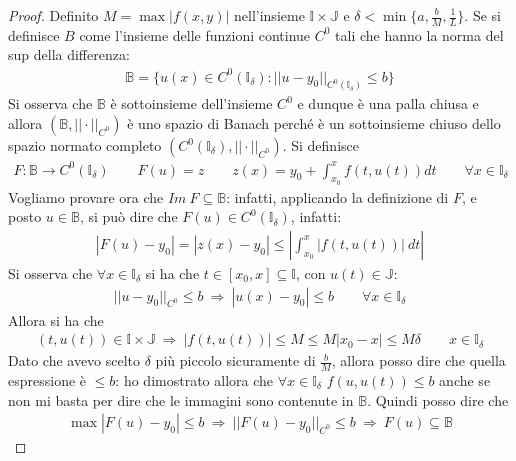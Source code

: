 \documentclass[a4paper, oneside]{book}
\begin{document}
\begin{proof}
    Definito $M = \max \left| f(x, y) \right|$ nell'insieme $\mathbb{I} \times \mathbb{J}$ e $\delta < \min\{a, \frac{b}{M}, \frac{1}{L}\}$.
    Se si definisce $B$ come l'insieme delle funzioni continue $C^{0}$ tali che hanno la norma
    del sup della differenza:
    \begin{gather*}
        \mathbb{B} = \{u(x) \in C^{0}(\mathbb{I}_\delta) : ||u - y_0||_{C^{0} (\mathbb{I}_\delta) } \leq b\}
    \end{gather*} 
    Si osserva che $\mathbb{B}$ è sottoinsieme dell'insieme $C^{0}$ e dunque è una palla chiusa e allora
    $(\mathbb{B}, || \cdot ||_{C^{0} })$ è uno spazio di Banach perché è un sottoinsieme chiuso dello
    spazio normato completo $(C^{0}(\mathbb{I}_\delta),||\cdot ||_{C^{0} } )$. Si definisce
    \begin{gather*}
        F : \mathbb{B} \to C^{0}(\mathbb{I}_\delta) \qquad F(u) = z \qquad z(x) = y_0 + \int_{x_0}^{x} f(t, u(t))dt \qquad \forall x \in \mathbb{I}_\delta 
    \end{gather*}
    Vogliamo provare ora che  $Im \ F \subseteq \mathbb{B}$: infatti, applicando la definizione di
    $F$, e posto $u \in \mathbb{B}$, si può dire che $F(u) \in C^{0}(\mathbb{I}_\delta)$, infatti:
    \begin{gather*}
        |F(u) - y_0| = |z(x) - y_0| \leq \left| \int_{x_0}^{x} \left| f(t, u(t)) \right| \ dt  \right|  
    \end{gather*}
    Si osserva che $\forall x \in \mathbb{I}_\delta$ si ha che $t \in [x_0, x] \subseteq \mathbb{I}$, con $u(t) \in \mathbb{J}$:
    \begin{gather*}
        ||u - y_0||_{C^{0} } \leq b  \ \Longrightarrow \ \left| u(x) - y_0 \right| \leq b \qquad \forall x \in \mathbb{I}_\delta 
    \end{gather*}
    Allora si ha che
    \begin{gather*}
        (t, u(t)) \in \mathbb{I} \times \mathbb{J} \ \Longrightarrow \ |f(t, u(t))| \leq M \leq M|x_0 - x| \leq M \delta \qquad x \in \mathbb{I}_\delta
    \end{gather*}
    Dato che avevo scelto $\delta$ più piccolo sicuramente di $\frac{b}{M}$, allora posso dire che
    quella espressione è $\leq b$: ho dimostrato allora che $\forall x \in \mathbb{I}_\delta$ $f(u, u(t)) \leq b$ anche se non mi basta
    per dire che le immagini sono contenute in $\mathbb{B}$. Quindi posso dire che
    \begin{gather*}
        \max  |F(u) - y_0| \leq b \ \Longrightarrow \ ||F(u) - y_0||_{C^{0}} \leq b \ \Longrightarrow \ F(u) \subseteq \mathbb{B}

\end{gather*}
\end{proof}
\end{document}
